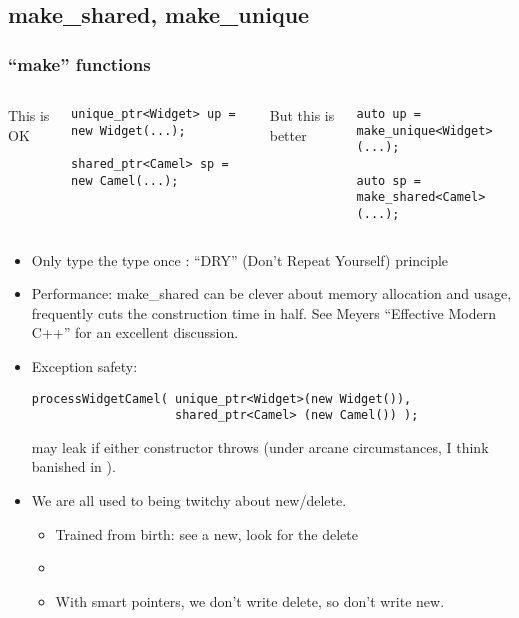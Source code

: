 

\subsection{make\_shared, make\_unique}
\begin{frame}[fragile]
\frametitle{``make'' functions}
\begin{columns}[t]
This is OK
{\scriptsize\begin{verbatim}
unique_ptr<Widget> up = new Widget(...);

shared_ptr<Camel> sp = new Camel(...);
\end{verbatim}}
\pause{}
But this is better
{\scriptsize\begin{verbatim}
auto up = make_unique<Widget>(...);

auto sp = make_shared<Camel>(...);
\end{verbatim}}
\end{columns}
\vskip 12pt
\pause{}
\begin{itemize}
\item Only type the type once : ``DRY'' (Don't Repeat Yourself) principle
\vskip 6pt
\item Performance: make\_shared can be clever about memory allocation
  and usage, frequently cuts the construction time in half.  See
  Meyers ``Effective Modern C++'' for an excellent discussion.
\item Exception safety:
{\scriptsize\begin{verbatim}
processWidgetCamel( unique_ptr<Widget>(new Widget()),
                    shared_ptr<Camel> (new Camel()) );
\end{verbatim}}
may leak if either constructor throws (under arcane circumstances, I
think banished in ).  
\vskip 6pt
\item We are all used to being twitchy about new/delete.  
\begin{itemize}
  \item Trained from birth: see a new, look for the delete
  \item {}
  \item With smart pointers, we don't write delete, so don't write new.
  \end{itemize}
\end{itemize}
\pause{}

\end{frame}


